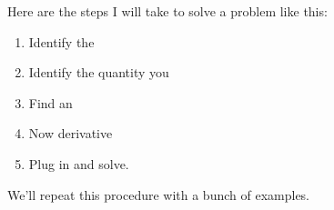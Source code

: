 \documentclass[11pt,fleqn]{article}
\begin{document}
\setlength{\parindent}{0cm}
\renewcommand{\headrulewidth}{0pt}
\newcommand{\blank}[1]{\rule{#1}{0.75pt}}
\renewcommand{\d}{\displaystyle}
\vspace*{-0.7in}
\begin{center}
 {\large{ }}
\end{center}
 	
Here are the steps I will take to solve a problem like this:
\begin{enumerate}
\item Identify the  
\item Identify the quantity you  
\item Find an 
\item Now derivative  
\item Plug in and solve.
\end{enumerate}
We'll repeat this procedure with a bunch of examples.
\end{document}
